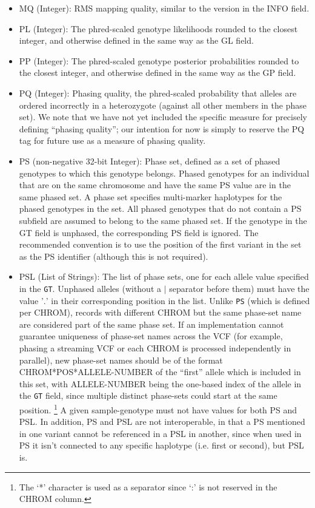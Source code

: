 \documentclass[8pt]{article}
\begin{document}
\begin{itemize}
  \item MQ (Integer): RMS mapping quality, similar to the version in the INFO field.
  \item PL (Integer): The phred-scaled genotype likelihoods rounded to the closest integer, and otherwise defined in the same way as the GL field.
  \item PP (Integer): The phred-scaled genotype posterior probabilities rounded to the closest integer, and otherwise defined in the same way as the GP field.
  \item PQ (Integer): Phasing quality, the phred-scaled probability that alleles are ordered incorrectly in a heterozygote (against all other members in the phase set).
  We note that we have not yet included the specific measure for precisely defining ``phasing quality''; our intention for now is simply to reserve the PQ tag for future use as a measure of phasing quality.
  \item PS (non-negative 32-bit Integer): Phase set, defined as a set of phased genotypes to which this genotype belongs.
  Phased genotypes for an individual that are on the same chromosome and have the same PS value are in the same phased set.
  A phase set specifies multi-marker haplotypes for the phased genotypes in the set.
  All phased genotypes that do not contain a PS subfield are assumed to belong to the same phased set.
  If the genotype in the GT field is unphased, the corresponding PS field is ignored.
  The recommended convention is to use the position of the first variant in the set as the PS identifier (although this is not required).
  \item PSL (List of Strings): The list of phase sets, one for each allele value specified in the {\tt GT}.
  Unphased alleles (without a $\mid$ separator before them) must have the value '$.$' in their corresponding position in the list.
  Unlike {\tt PS} (which is defined per CHROM), records with different CHROM but the same phase-set name are considered part of the same phase set.
  If an implementation cannot guarantee uniqueness of phase-set names across the VCF (for example, phasing a streaming VCF or each CHROM is processed independently in parallel), new phase-set names should be of the format CHROM*POS*ALLELE-NUMBER of the ``first'' allele which is included in this set, with ALLELE-NUMBER being the one-based index of the allele in the {\tt GT} field, since multiple distinct phase-sets could start at the same position. \footnote{The `*' character is used as a separator since `:' is not reserved in the CHROM column.}
  A given sample-genotype must not have values for both PS and PSL.
  In addition, PS and PSL are not interoperable, in that a PS mentioned in one variant cannot be referenced in a PSL in another,  since when used in PS it isn't connected to any specific haplotype (i.e. first or second), but PSL is.


\end{itemize}
\end{document}
